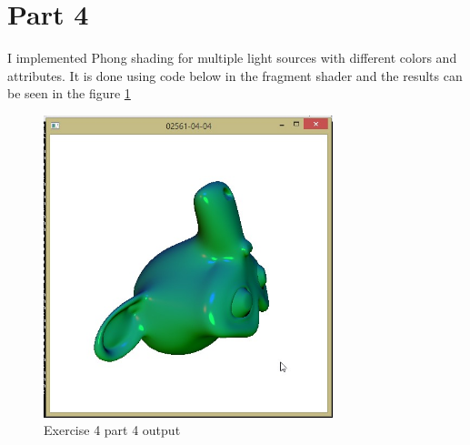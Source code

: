 \section{Part 4}
I implemented Phong shading for multiple light sources with different colors and attributes.
It is done using code below in the fragment shader and the results can be seen in the figure
\ref{fig:exercise_4_part_4}

\begin{figure}[ht!]
	\begin{center}
		\includegraphics[width=0.75\textwidth]{figures/exercise_4_part_4}
	\end{center}
	\vspace{-4.5ex}\caption{Exercise 4 part 4 output}
	\label{fig:exercise_4_part_4} 
\end{figure}

